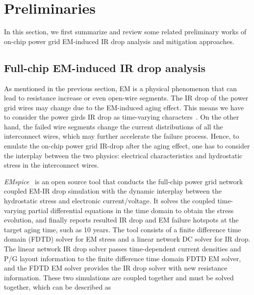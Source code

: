 \section{Preliminaries}
\label{sec:related}

In this section, we first summarize and review some related preliminary works of on-chip power grid EM-induced IR drop analysis and mitigation approaches.

\subsection{Full-chip EM-induced IR drop analysis}
\label{subsec:emspice}
As mentioned in the previous section, EM is a physical phenomenon that can lead to resistance increase or even open-wire segments.  The IR drop of the power grid wires may change due to the EM-induced aging effect. This means we have to consider the power girds IR drop as time-varying characters~\cite{SunYu:TDMR'20, Huang:TCAD'15, Chatterjee:2018TCAD,SukharevNajm:2018TDMR}. 
On the other hand, the failed wire segments change the current distributions of all the interconnect wires, which may further accelerate the failure process. Hence, to emulate the on-chip power grid IR-drop after the aging effect, one has to consider the interplay between the two physics: electrical characteristics and hydrostatic stress in the interconnect wires.

{\it EMspice}~\cite{SunYu:TDMR'20,EMspiceSourceCode} is an open source tool that conducts the full-chip power grid network coupled EM-IR drop simulation with the dynamic interplay between the hydrostatic stress and electronic current/voltage. It solves the coupled time-varying partial differential equations in the time domain to obtain the stress evolution, and finally reports resulted IR drop and EM failure hotspots at the target aging time, such as 10 years.  The tool consists of a finite difference time domain (FDTD) solver for EM stress and a linear network DC solver for IR drop. The linear network IR drop solver passes time-dependent current densities and P/G layout information to the finite difference time domain FDTD EM solver, and the FDTD EM solver provides the IR drop solver with new resistance information. These two simulations are coupled together and must be solved together, which can be described as


